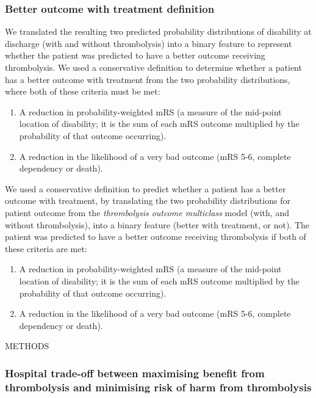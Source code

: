 \subsubsection{Better outcome with treatment definition}

We translated the resulting two predicted probability distributions of disability at discharge (with and without thrombolysis) into a binary feature to represent whether the patient was predicted to have a better outcome receiving thrombolysis. We used a conservative definition to determine whether a patient has a better outcome with treatment from the two probability distributions, where both of these criteria must be met: 

\begin{enumerate}
    \item A reduction in probability-weighted mRS (a measure of the mid-point location of disability; it is the sum of each mRS outcome multiplied by the probability of that outcome occurring).
    \item A reduction in the likelihood of a very bad outcome (mRS 5-6, complete dependency or death).
\end{enumerate}



We used a conservative definition to predict whether a patient has a better outcome with treatment, by translating the two probability distributions for patient outcome from the \textit{thrombolysis outcome multiclass} model (with, and without thrombolysis), into a binary feature (better with treatment, or not). The patient was predicted to have a better outcome receiving thrombolysis if both of these criteria are met: 

\begin{enumerate}
    \item A reduction in probability-weighted mRS (a measure of the mid-point location of disability; it is the sum of each mRS outcome multiplied by the probability of that outcome occurring).
    \item A reduction in the likelihood of a very bad outcome (mRS 5-6, complete dependency or death).
\end{enumerate}


METHODS

\subsubsection{Hospital trade-off between maximising benefit from thrombolysis and minimising risk of harm from thrombolysis}

